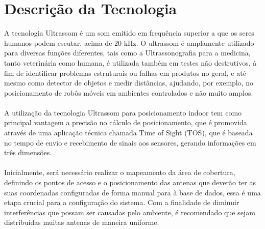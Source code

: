 \chapter{Descrição da Tecnologia}
\label{chap:fundteor}



A tecnologia Ultrassom é um som emitido em frequência superior a que os seres humanos podem escutar, acima de 20 kHz. O ultrassom é amplamente utilizado para diversas funções diferentes, tais como a Ultrassonografia para a medicina, tanto veterinária como humana, é utilizada também em testes não destrutivos, à fim de identificar problemas estruturais ou falhas em produtos no geral, e até mesmo como detector de objetos e medir distâncias, ajudando, por exemplo, no posicionamento de robôs móveis em ambientes controlados e não muito amplos.\\
\\
A utilização da tecnologia Ultrassom para posicionamento indoor tem como principal vantagem a precisão no cálculo de posicionamento, que é promovida através de uma aplicação técnica chamada Time of Sight (TOS), que é baseada no tempo de envio e recebimento de sinais aos sensores, gerando informações em três dimensões. \\
\\
Inicialmente, será necessário realizar o mapeamento da área de cobertura, definindo os pontos de acesso e o posicionamento das antenas que deverão ter as suas coordenadas configuradas de forma manual para à base de dados, essa é uma etapa crucial para a configuração do sistema. Com a finalidade de diminuir interferências que possam ser causadas pelo ambiente, é recomendado que sejam distribuídas muitas antenas de maneira uniforme.\\
